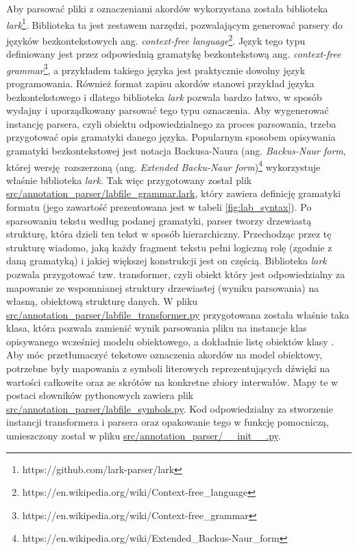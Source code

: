 Aby parsować pliki z oznaczeniami akordów wykorzystana została biblioteka
\emph{lark}\footnote{https://github.com/lark-parser/lark}. Biblioteka ta jest zestawem narzędzi,
pozwalającym generować parsery do języków bezkontekstowych ang. \emph{context-free
language}\footnote{https://en.wikipedia.org/wiki/Context-free\_language}. Język tego typu definiowany
jest przez odpowiednią gramatykę bezkontekstową ang. \emph{context-free
grammar}\footnote{https://en.wikipedia.org/wiki/Context-free\_grammar}, a przykładem takiego języka
jest praktycznie dowolny język programowania. Również format zapisu akordów stanowi przykład języka
bezkontekstowego i dlatego biblioteka \emph{lark} pozwala bardzo łatwo, w sposób wydajny i
uporządkowany parsować tego typu oznaczenia. Aby wygenerować instancję parsera, czyli obiektu
odpowiedzialnego za proces parsowania, trzeba przygotować opis gramatyki danego języka. Popularnym
sposobem opisywania gramatyki bezkontekstowej jest notacja Backusa-Naura (ang. \emph{Backus-Naur
form}, której wersję rozszerzoną (ang. \emph{Extended Backu-Naur
form})\footnote{https://en.wikipedia.org/wiki/Extended\_Backus-Naur\_form} wykorzystuje właśnie
biblioteka \emph{lark}. Tak więc przygotowany został plik
\url{src/annotation\_parser/labfile\_grammar.lark}, który zawiera definicję gramatyki formatu
 (jego zawartość prezentowana jest w tabeli \ref{fig:lab_syntax}). Po sparsowaniu tekstu
według podanej gramatyki, parser tworzy drzewiastą strukturę, która dzieli ten tekst w sposób
hierarchiczny. Przechodząc przez tę strukturę wiadomo, jaką każdy fragment tekstu pełni logiczną
rolę (zgodnie z daną gramatyką) i jakiej większej konstrukcji jest on częścią. Biblioteka
\emph{lark} pozwala przygotować tzw. transformer, czyli obiekt który jest odpowiedzialny za
mapowanie ze wspomnianej struktury drzewiastej (wyniku parsowania) na własną, obiektową strukturę
danych. W pliku \url{src/annotation\_parser/labfile\_transformer.py} przygotowana została właśnie taka
klasa, która pozwala zamienić wynik parsowania pliku  na instancje klas opisywanego
wcześniej modelu obiektowego, a dokładnie listę obiektów klasy . Aby móc
przetłumaczyć tekstowe oznaczenia akordów na model obiektowy, potrzebne były mapowania z symboli
literowych reprezentujących dźwięki na wartości całkowite oraz ze skrótów na konkretne zbiory
interwałów. Mapy te w postaci słowników pythonowych zawiera plik
\url{src/annotation\_parser/labfile\_symbols.py}. Kod odpowiedzialny za stworzenie instancji
transformera i parsera oraz opakowanie tego w funkcję pomocniczą, umieszczony został w pliku
\url{src/annotation\_parser/\_\_init\_\_.py}. 

